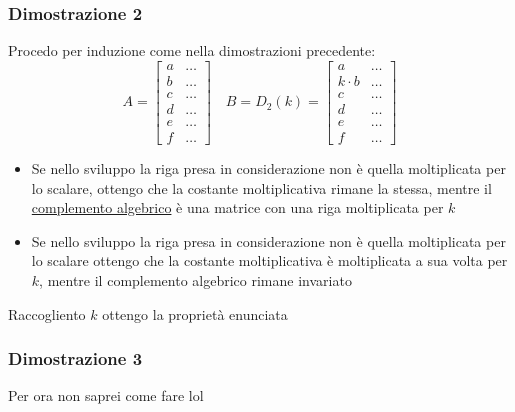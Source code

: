 \subsubsection*{Dimostrazione 2}
Procedo per induzione come nella dimostrazioni precedente:
\[
	A=
	\begin{bmatrix}
		a & \ldots \\b& \ldots\\c& \ldots  \\d& \ldots\\e& \ldots\\f & \ldots
	\end{bmatrix}
	\quad
	B= D_2\left( k \right) =
	\begin{bmatrix}
		a & \ldots \\k\cdot b& \ldots\\c& \ldots  \\d& \ldots\\e& \ldots\\f & \ldots
	\end{bmatrix}
\]
\begin{itemize}
	\item Se nello sviluppo la riga presa in considerazione non è quella moltiplicata per lo scalare, ottengo che la costante moltiplicativa rimane la stessa, mentre il \underline{complemento algebrico} è una matrice con una riga moltiplicata per $ k $
	\item Se nello sviluppo la riga presa in considerazione non è quella moltiplicata per lo scalare ottengo che la costante moltiplicativa è moltiplicata a sua volta per $ k $, mentre il complemento algebrico rimane invariato
\end{itemize}
Raccogliento $ k $ ottengo la proprietà enunciata
\subsubsection*{Dimostrazione 3}
Per ora non saprei come fare lol

